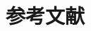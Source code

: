 \chapter*{参考文献}
{}

\settowidth{\refkeywidth}{\small[TKNDnN82]}
\newcommand{\refitem}[2]{%
  \par\noindent
  \hangindent=\dimexpr\refkeywidth+0.8em\relax
  \hangafter=1
  \makebox[\refkeywidth][r]{#1}\hspace{0.8em}#2\par
  \addvspace{2.5pt}}

\begingroup
\small
\setlength{\parindent}{0pt}

